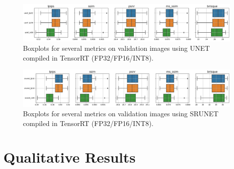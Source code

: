 \begin{figure}[h]
\includegraphics[width=1.0\textwidth]{static/2023_03_02_boxplots_metrics_quant_UNet.png}
\caption{Boxplots for several metrics on validation images using UNET compiled in TensorRT (FP32/FP16/INT8).}
\label{fig:timings-unet}
\end{figure}

\begin{figure}[h]
\includegraphics[width=1.0\textwidth]{static/2023_03_02_boxplots_metrics_quant_SRUNET.png}
\caption{Boxplots for several metrics on validation images using SRUNET compiled in TensorRT (FP32/FP16/INT8).}
\label{fig:timings-srunet}
\end{figure}
\clearpage

\section{Qualitative Results}
\label{sec:qualitative-results}

